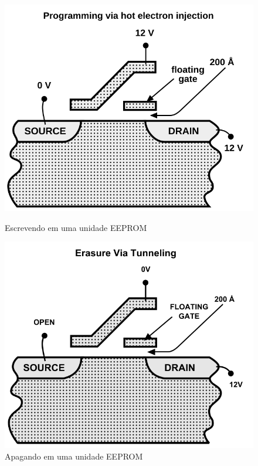\documentclass{article}
\begin{document}
\begin{figure}[!h]
\centering
\begin{minipage}{0.38\textwidth}
    \centering
    \includegraphics[width=\linewidth]{CharginEEPROM.png}
    \caption{Escrevendo em uma unidade EEPROM}
    \label{fig:writingEEPROM}
\end{minipage}\hfill
\begin{minipage}{0.38\textwidth}
    \centering
    \includegraphics[width=\linewidth]{DischarginEEPROM.png}
    \caption{Apagando em uma unidade EEPROM}
    \label{fig:dischargingEEPROM}
\end{minipage}
\end{figure}
\end{document}

